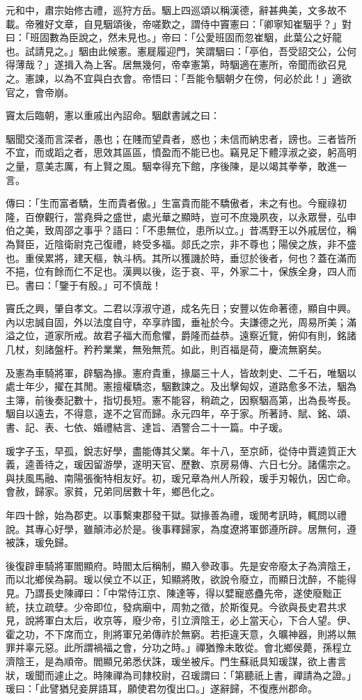 \begin{pinyinscope}
元和中，肅宗始修古禮，巡狩方岳。駰上四巡頌以稱漢德，辭甚典美，文多故不載。帝雅好文章，自見駰頌後，帝嗟歎之，謂侍中竇憲曰：「卿寧知崔駰乎？」對曰：「班固數為臣說之，然未見也。」帝曰：「公愛班固而忽崔駰，此葉公之好龍也。試請見之。」駰由此候憲。憲屣履迎門，笑謂駰曰：「亭伯，吾受詔交公，公何得薄哉？」遂揖入為上客。居無幾何，帝幸憲第，時駰適在憲所，帝聞而欲召見之。憲諫，以為不宜與白衣會。帝悟曰：「吾能令駰朝夕在傍，何必於此！」適欲官之，會帝崩。

竇太后臨朝，憲以重戚出內詔命。駰獻書誡之曰：

駰聞交淺而言深者，愚也；在賤而望貴者，惑也；未信而納忠者，謗也。三者皆所不宜，而或蹈之者，思效其區區，憤盈而不能已也。竊見足下體淳淑之姿，躬高明之量，意美志厲，有上賢之風。駰幸得充下館，序後陳，是以竭其拳拳，敢進一言。

傳曰：「生而富者驕，生而貴者傲。」生富貴而能不驕傲者，未之有也。今寵祿初隆，百僚觀行，當堯舜之盛世，處光華之顯時，豈可不庶幾夙夜，以永眾譽，弘申伯之美，致周邵之事乎？語曰：「不患無位，患所以立。」昔馮野王以外戚居位，稱為賢臣，近陰衛尉克己復禮，終受多福。郯氏之宗，非不尊也；陽侯之族，非不盛也。重侯累將，建天樞，執斗柄。其所以獲譏於時，垂愆於後者，何也？蓋在滿而不挹，位有餘而仁不足也。漢興以後，迄于哀、平，外家二十，保族全身，四人而已。書曰：「鑒于有殷。」可不慎哉！

竇氏之興，肇自孝文。二君以淳淑守道，成名先日；安豐以佐命著德，顯自中興。內以忠誠自固，外以法度自守，卒享祚國，垂祉於今。夫謙德之光，周易所美；滿溢之位，道家所戒。故君子福大而愈懼，爵隆而益恭。遠察近覽，俯仰有則，銘諸几杖，刻諸盤杅。矜矜業業，無殆無荒。如此，則百福是荷，慶流無窮矣。

及憲為車騎將軍，辟駰為掾。憲府貴重，掾屬三十人，皆故刺史、二千石，唯駰以處士年少，擢在其閒。憲擅權驕恣，駰數諫之。及出擊匈奴，道路愈多不法，駰為主簿，前後奏記數十，指切長短。憲不能容，稍疏之，因察駰高第，出為長岑長。駰自以遠去，不得意，遂不之官而歸。永元四年，卒于家。所著詩、賦、銘、頌、書、記、表、七依、婚禮結言、達旨、酒警合二十一篇。中子瑗。

瑗字子玉，早孤，銳志好學，盡能傳其父業。年十八，至京師，從侍中賈逵質正大義，逵善待之，瑗因留游學，遂明天官、歷數、京房易傳、六日七分。諸儒宗之。與扶風馬融、南陽張衡特相友好。初，瑗兄章為州人所殺，瑗手刃報仇，因亡命。會赦，歸家。家貧，兄弟同居數十年，鄉邑化之。

年四十餘，始為郡吏。以事繫東郡發干獄。獄掾善為禮，瑗閒考訊時，輒問以禮說。其專心好學，雖顛沛必於是。後事釋歸家，為度遼將軍鄧遵所辟。居無何，遵被誅，瑗免歸。

後復辟車騎將軍閻顯府。時閻太后稱制，顯入參政事。先是安帝廢太子為濟陰王，而以北鄉侯為嗣。瑗以侯立不以正，知顯將敗，欲說令廢立，而顯日沈醉，不能得見。乃謂長史陳禪曰：「中常侍江京、陳達等，得以嬖寵惑蠱先帝，遂使廢黜正統，扶立疏孽。少帝即位，發病廟中，周勃之徵，於斯復見。今欲與長史君共求見，說將軍白太后，收京等，廢少帝，引立濟陰王，必上當天心，下合人望。伊、霍之功，不下席而立，則將軍兄弟傳祚於無窮。若拒違天意，久曠神器，則將以無罪并辜元惡。此所謂禍福之會，分功之時。」禪猶豫未敢從。會北鄉侯薨，孫程立濟陰王，是為順帝。閻顯兄弟悉伏誅，瑗坐被斥。門生蘇祇具知瑗謀，欲上書言狀，瑗聞而遽止之。時陳禪為司隸校尉，召瑗謂曰：「第聽祇上書，禪請為之證。」瑗曰：「此譬猶兒妾屏語耳，願使君勿復出口。」遂辭歸，不復應州郡命。


\end{pinyinscope}
